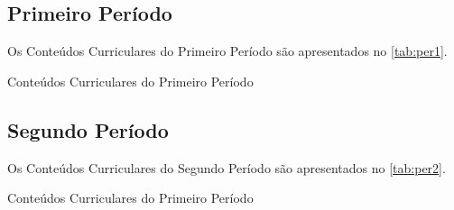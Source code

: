 \subsection{Primeiro Período}

Os Conteúdos Curriculares do Primeiro Período são apresentados no \autoref{tab:per1}.

\begin{table}[htb!]
	\centering\tiny
	\caption{Conteúdos Curriculares do Primeiro Período}
	
	\label{tab:per1}
\end{table}

\subsection{Segundo Período}

Os Conteúdos Curriculares do Segundo Período são apresentados no \autoref{tab:per2}.

\begin{table}[htb!]
	\centering\tiny
	\caption{Conteúdos Curriculares do Primeiro Período}
	
	\label{tab:per2}
\end{table}



